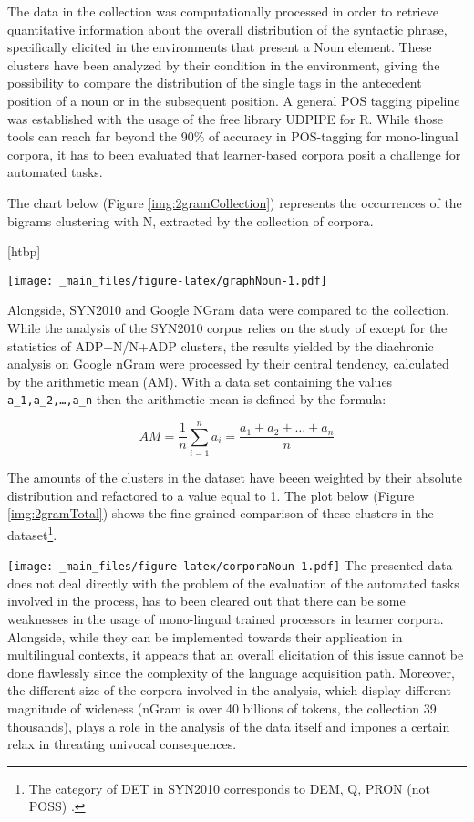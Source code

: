 \documentclass[a4paper,twoside,12pt,chapterprefix=false,listof=flat]{scrartcl}
\makeatletter
\def\fps@figure{htbp}
\renewenvironment{figure}[1][\fps@figure]{
  \edef\@tempa{\noexpand\@float{figure}[#1]} 
  \@tempa
  \sffamily
}{
  \end@float
}
\theoremstyle{plain} %
\theoremstyle{definition}
\theoremstyle{remark}
\makeatother
\begin{document}
The data in the collection was computationally processed in order to
retrieve quantitative information about the overall distribution of the
syntactic phrase, specifically elicited in the environments that present
a Noun element. These clusters have been analyzed by their condition in
the environment, giving the possibility to compare the distribution of
the single tags in the antecedent position of a noun or in the
subsequent position. A general POS tagging pipeline was established with
the usage of the free library UDPIPE for R. While those tools can reach
far beyond the 90\% of accuracy in POS-tagging for mono-lingual corpora,
it has to been evaluated that learner-based corpora posit a challenge
for automated tasks.

The chart below (Figure \ref{img:2gramCollection}) represents the
occurrences of the bigrams clustering with N, extracted by the
collection of corpora.

\begin{figure}
\centering
\texttt{[image: \_main\_files/figure-latex/graphNoun-1.pdf]}
\caption{\label{fig:graphNoun}\label{img:2gramCollection}Distribution of
2-grams with N in Collection}
\end{figure}

Alongside, SYN2010 and Google NGram data were compared to the
collection.\\
While the analysis of the SYN2010 corpus relies on the study of
\citep{veselovska2014} except for the statistics of ADP+N/N+ADP
clusters, the results yielded by the diachronic analysis on Google nGram
were processed by their central tendency, calculated by the arithmetic
mean (AM). With a data set containing the values
\texttt{a\_1,a\_2,\ldots{},a\_n} then the arithmetic mean is defined by
the formula:

\begin{equation}
    AM=\frac{1}{n}\sum_{i=1}^n a_i = \frac{a_1 + a_2 + \ldots + a_n}{n} 
\end{equation}

The amounts of the clusters in the dataset have beeen weighted by their
absolute distribution and refactored to a value equal to 1. The plot
below (Figure \ref{img:2gramTotal}) shows the fine-grained comparison of
these clusters in the dataset\footnote{The category of DET in SYN2010
  corresponds to DEM, Q, PRON (not POSS) \citep[20]{veselovska2014}.}.

\texttt{[image: \_main\_files/figure-latex/corporaNoun-1.pdf]} The
presented data does not deal directly with the problem of the evaluation
of the automated tasks involved in the process, has to been cleared out
that there can be some weaknesses in the usage of mono-lingual trained
processors in learner corpora. Alongside, while they can be implemented
towards their application in multilingual contexts, it appears that an
overall elicitation of this issue cannot be done flawlessly since the
complexity of the language acquisition path. Moreover, the different
size of the corpora involved in the analysis, which display different
magnitude of wideness (nGram is over 40 billions of tokens, the
collection 39 thousands), plays a role in the analysis of the data
itself and impones a certain relax in threating univocal consequences.
\end{document}
